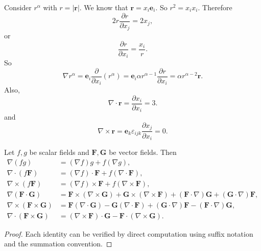 \documentclass[a4paper]{article}
\begin{document}
\begin{eg}
  Consider $r^\alpha$ with $r = |\mathbf{r}|$. We know that $\mathbf{r}= x_i\mathbf{e}_i$. So $r^2 = x_ix_i$. Therefore
  \[
    2r\frac{\partial r}{\partial x_j} = 2x_j,
  \]
  or
  \[
    \frac{\partial r}{\partial x_i} = \frac{x_i}{r}.
  \]
  So
  \[
    \nabla r^\alpha = \mathbf{e}_i \frac{\partial}{\partial x_i}(r^\alpha) = \mathbf{e}_i\alpha r^{\alpha - 1}\frac{\partial r}{\partial x_i} = \alpha r^{\alpha - 2}\mathbf{r}.
  \]
  Also,
  \[
    \nabla\cdot \mathbf{r} = \frac{\partial x_i}{\partial x_i} = 3.
  \]
  and
  \[
    \nabla \times \mathbf{r} = \mathbf{e}_k \varepsilon_{ijk}\frac{\partial x_j}{\partial x_i} = 0.
  \]
\end{eg}

\begin{prop}
  Let $f, g$ be scalar fields and $\mathbf{F}, \mathbf{G}$ be vector fields. Then
  \begin{align*}
    \nabla(fg) &= (\nabla f)g + f(\nabla g),\\
    \nabla\cdot (f\mathbf{F}) &= (\nabla f)\cdot \mathbf{F} + f(\nabla\cdot \mathbf{F}),\\
    \nabla\times (f\mathbf{F}) &= (\nabla f)\times \mathbf{F} + f(\nabla\times \mathbf{F}),\\
    \nabla(\mathbf{F}\cdot \mathbf{G}) &= \mathbf{F}\times (\nabla \times \mathbf{G}) + \mathbf{G}\times (\nabla \times \mathbf{F}) + (\mathbf{F}\cdot \nabla)\mathbf{G} + (\mathbf{G}\cdot \nabla) \mathbf{F},\\
    \nabla \times (\mathbf{F}\times \mathbf{G}) &= \mathbf{F}(\nabla\cdot \mathbf{G}) - \mathbf{G}(\nabla\cdot \mathbf{F}) + (\mathbf{G}\cdot \nabla)\mathbf{F} - (\mathbf{F}\cdot \nabla)\mathbf{G},\\
    \nabla\cdot (\mathbf{F}\times \mathbf{G}) &= (\nabla\times \mathbf{F})\cdot \mathbf{G} - \mathbf{F}\cdot (\nabla\times \mathbf{G}).
  \end{align*}
\end{prop}

\begin{proof}
  Each identity can be verified by direct computation using suffix notation and the summation convention.
\end{proof}
\end{document}
